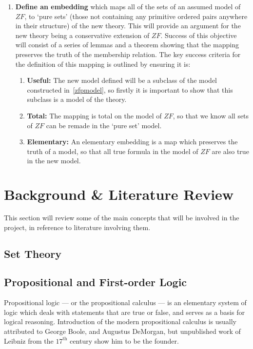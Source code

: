 \documentclass[11pt]{report}
\theoremstyle{definition}
\theoremstyle{theorem}
\theoremstyle{lemma}
\begin{document}
\begin{enumerate}
  \item \textbf{Define an embedding} which maps all of the sets of an assumed model of $\mathit{ZF}$, to `pure sets' (those not containing any primitive ordered pairs anywhere in their structure) of the new theory. 
  This will provide an argument for the new theory being a conservative extension of $\mathit{ZF}$.
  Success of this objective will consist of a series of lemmas and a theorem showing that the mapping preserves the truth of the membership relation. 
  The key success criteria for the definition of this mapping is outlined by ensuring it is:
  \begin{enumerate}
    \item \textbf{Useful:} The new model defined will be a subclass of the model constructed in~\ref{zfpmodel}, so firstly it is important to show that this subclass is a model of the theory.
    \item \textbf{Total:} The mapping is total on the model of $\mathit{ZF}$, so that we know all sets of $\mathit{ZF}$ can be remade in the `pure set' model. 
    \item \textbf{Elementary:} An elementary embedding is a map which preserves the truth of a model, so that all true formula in the model of $\mathit{ZF}$ are also true in the new model.   
  \end{enumerate} 
\end{enumerate}


\chapter{Background \& Literature Review}
This section will review some of the main concepts that will be involved in the project, in reference to literature involving them.

\section{Set Theory}


\section{Propositional and First-order Logic}
Propositional logic --- or the propositional calculus --- is an elementary system of logic which deals with statements that are true or false, and serves as a basis for logical reasoning. 
Introduction of the modern propositional calculus is usually attributed to George Boole, and Augustus DeMorgan, but unpublished work of Leibniz from the $17^{\text{th}}$ century show him to be the founder.
\end{document}
